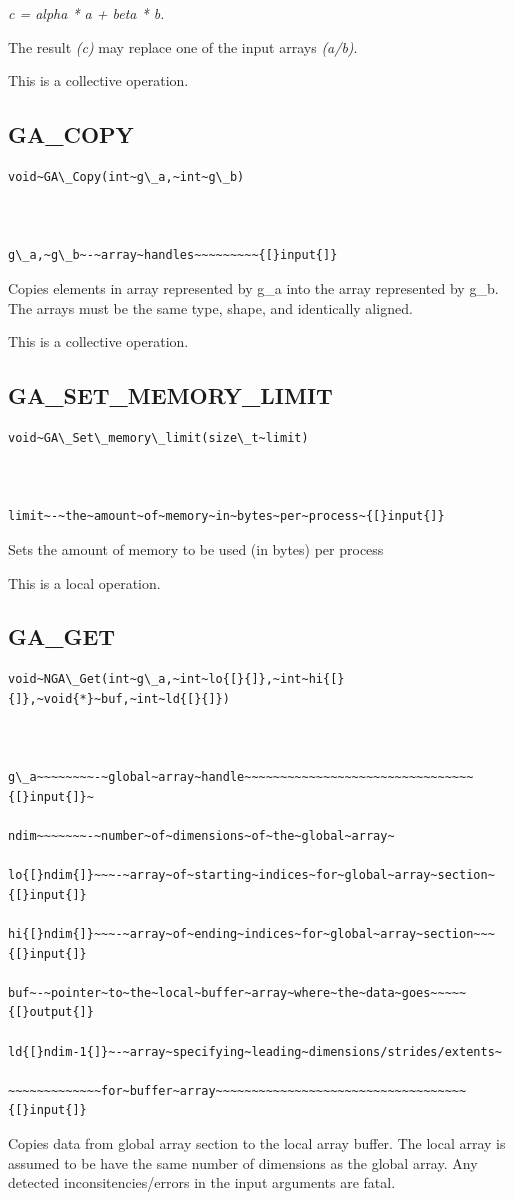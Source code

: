 \emph{c = alpha {*} a + beta {*} b.}

The result \emph{(c)} may replace one of the input arrays \emph{(a/b)}.

This is a collective operation. 


\subsection*{\label{sub:GA_COPY}GA\_COPY}
\begin{verbatim}
void~GA\_Copy(int~g\_a,~int~g\_b)



g\_a,~g\_b~-~array~handles~~~~~~~~~{[}input{]}
\end{verbatim}
Copies elements in array represented by g\_a into the array represented
by g\_b. The arrays must be the same type, shape, and identically
aligned.

This is a collective operation.


\subsection*{\label{sub:GA_SET_MEMORY_LIMIT}GA\_SET\_MEMORY\_LIMIT}
\begin{verbatim}
void~GA\_Set\_memory\_limit(size\_t~limit)



limit~-~the~amount~of~memory~in~bytes~per~process~{[}input{]}
\end{verbatim}
Sets the amount of memory to be used (in bytes) per process

This is a local operation.


\subsection*{\label{sub:GA_GET}GA\_GET}
\begin{verbatim}
void~NGA\_Get(int~g\_a,~int~lo{[}{]},~int~hi{[}{]},~void{*}~buf,~int~ld{[}{]})



g\_a~~~~~~~~-~global~array~handle~~~~~~~~~~~~~~~~~~~~~~~~~~~~~~~~{[}input{]}~

ndim~~~~~~~-~number~of~dimensions~of~the~global~array~

lo{[}ndim{]}~~~-~array~of~starting~indices~for~global~array~section~{[}input{]}

hi{[}ndim{]}~~~-~array~of~ending~indices~for~global~array~section~~~{[}input{]}

buf~-~pointer~to~the~local~buffer~array~where~the~data~goes~~~~~{[}output{]}

ld{[}ndim-1{]}~-~array~specifying~leading~dimensions/strides/extents~

~~~~~~~~~~~~~for~buffer~array~~~~~~~~~~~~~~~~~~~~~~~~~~~~~~~~~~~{[}input{]}
\end{verbatim}
Copies data from global array section to the local array buffer. The
local array is assumed to be have the same number of dimensions as
the global array. Any detected inconsitencies/errors in the input
arguments are fatal.

